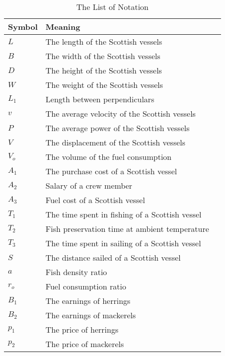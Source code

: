 \documentclass{mcmthesis}
\begin{document}
\begin{center}
\begin{longtable}{p{}p{}m{}}
\caption{The List of Notation}\\
\hline
Symbol& Meaning \\
\hline

$L$      & The length of the Scottish vessels
                                                         \\
$B$      & The width of the Scottish vessels 
                                                          \\
$D$     & The height of the Scottish vessels 
                                                        \\
$W$     & The weight of the Scottish vessels 
                                                        \\
$L_1$       & Length between perpendiculars                                                           \\
$v$      & The average velocity  of the Scottish vessels                                            \\
$P$      & The average power of the Scottish vessels
                                                        \\
$V$      & The displacement of the Scottish vessels 
                                                          \\
$V_o$      & The volume of the fuel consumption
                                                          \\
$A_1$     & The purchase cost of a Scottish vessel
                                                        \\
$A_2$       & Salary of a crew member                                                           \\
$A_3$      & Fuel cost of a Scottish vessel                                        \\
$T_1$     & The time spent in fishing of a Scottish vessel   
                                                        \\
$T_2$       & Fish preservation time at ambient temperature        \\
$T_3$      & The time spent in sailing of a Scottish vessel     \\
$S$      & The distance sailed of a Scottish vessel   \\
$a$      & Fish density ratio \\
$r_o$      & Fuel consumption ratio \\
$B_1$      & The earnings  of herrings \\
$B_2$      & The earnings  of mackerels  \\
$p_1$      & The price  of herrings \\
$p_2$      & The price  of mackerels  \\





\end{longtable}
\end{center}
\end{document}
